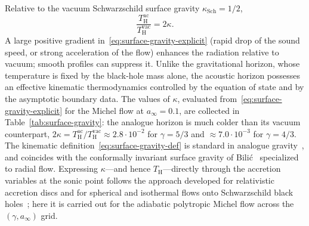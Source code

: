 \documentclass[12pt,a4paper,preprint]{elsarticle}
\begin{document}
            Relative to the vacuum Schwarzschild surface gravity $\kappa_{\mathrm{Sch}}=1/2$,
            \begin{equation}
                \frac{T^{\mathrm{ac}}_{\mathrm{H}}}{T^{\mathrm{vac}}_{\mathrm{H}}} = 2\kappa .
                \label{eq:temperature-ratio}
            \end{equation}
            A large positive gradient in~\eqref{eq:surface-gravity-explicit} (rapid drop of the sound speed, or strong acceleration of the flow) enhances the radiation relative to vacuum; smooth profiles can suppress it. Unlike the gravitational horizon, whose temperature is fixed by the black-hole mass alone, the acoustic horizon possesses an effective kinematic thermodynamics controlled by the equation of state and by the asymptotic boundary data. The values of $\kappa$, evaluated from~\eqref{eq:surface-gravity-explicit} for the Michel flow at $a_{\infty}=0.1$, are collected in Table~\ref{tab:surface-gravity}: the analogue horizon is much colder than its vacuum counterpart, $2\kappa=T^{\mathrm{ac}}_{\mathrm{H}}/T^{\mathrm{vac}}_{\mathrm{H}}\approx 2.8\cdot 10^{-2}$ for $\gamma=5/3$ and $\approx 7.0\cdot 10^{-3}$ for $\gamma=4/3$. The kinematic definition~\eqref{eq:surface-gravity-def} is standard in analogue gravity~\cite{UnruhWG_ExperimentalBlackHoleEvaporation_1981, VisserM_AcousticBlackHolesHorizonsErgospheresAndHawkingRadiation_1998}, and coincides with the conformally invariant surface gravity of Bili{\'c}~\cite{BilicN_RelativisticAcousticGeometry_1999} specialized to radial flow. Expressing $\kappa$---and hence $T_{\mathrm{H}}$---directly through the accretion variables at the sonic point follows the approach developed for relativistic accretion discs and for spherical and isothermal flows onto Schwarzschild black holes~\cite{DasTK_BilicN_DasguptaS_BlackHoleAccretionDiscAsAnAnalogueGravityModel_2007, TarafdarP_DasTK_GeometricConfigurationOfMatterForAxiallySymmetricBackgroundFlowsInTheSchwarzschildMetric_2013, ShaikhMA_FirdousiI_DasTK_RelativisticSonicGeometryForIsothermalAccretionInTheSchwarzschildMetric_2017}; here it is carried out for the adiabatic polytropic Michel flow across the $(\gamma,a_{\infty})$ grid.
\end{document}
